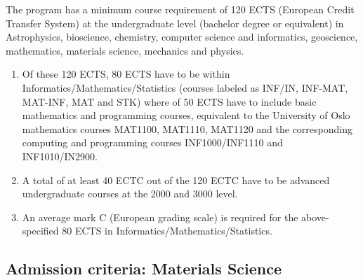 \documentclass[%
oneside,                 %
final,                   %
10pt]{article}
\begin{document}
The program has a minimum course requirement of 120 ECTS (European Credit Transfer System) at the undergraduate level (bachelor degree or equivalent) in Astrophysics, bioscience, chemistry, computer science and informatics, geoscience, mathematics, materials science, mechanics and physics. 
\begin{enumerate}
\item Of these 120 ECTS, 80 ECTS have to be within Informatics/Mathematics/Statistics (courses labeled as INF/IN, INF-MAT, MAT-INF, MAT and STK) where of 50 ECTS have to include basic mathematics and programming courses, equivalent to the University of Oslo mathematics courses MAT1100, MAT1110, MAT1120 and the corresponding computing and programming courses INF1000/INF1110 and INF1010/IN2900. 

\item A total of at least 40 ECTC out of the 120 ECTC have to be advanced undergraduate courses at the 2000 and 3000 level.

\item An average mark C (European grading scale) is required for the above-specified 80 ECTS in Informatics/Mathematics/Statistics.
\end{enumerate}

\noindent
\subsection{Admission criteria: Materials Science}
\end{document}
